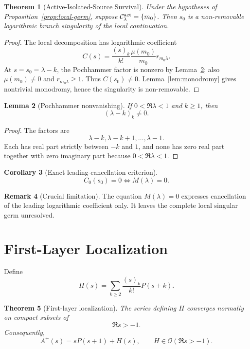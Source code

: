 \documentclass[11pt]{article}
\newtheorem{theorem}{Theorem}[section]
\newtheorem{corollary}[theorem]{Corollary}
\newtheorem{lemma}[theorem]{Lemma}
\theoremstyle{definition}
\newtheorem{remark}[theorem]{Remark}
\newcommand{\C}{\mathcal C}
\newcommand{\Ocal}{\mathcal O}
\begin{document}
\begin{theorem}[Active-Isolated-Source Survival]
\label{thm:survival}
Under the hypotheses of Proposition~\ref{prop:local-germ}, suppose $\C_\lambda^{\rm act}=\{m_0\}$. Then $s_0$ is a non-removable logarithmic branch singularity of the local continuation.
\end{theorem}

\begin{proof}
The local decomposition has logarithmic coefficient
\[
C(s)=\frac{(s)_k}{k!}\frac{\mu(m_0)}{m_0}r_{m_0\lambda}.
\]
At $s=s_0=\lambda-k$, the Pochhammer factor is nonzero by Lemma~\ref{lem:poch}; also $\mu(m_0)\ne0$ and $r_{m_0\lambda}\ge1$. Thus $C(s_0)\ne0$. Lemma~\ref{lem:monodromy} gives nontrivial monodromy, hence the singularity is non-removable.
\end{proof}


\begin{lemma}[Pochhammer nonvanishing]
\label{lem:poch}
If $0<\Re\lambda<1$ and $k\ge1$, then
\[
(\lambda-k)_k\ne0.
\]
\end{lemma}

\begin{proof}
The factors are
\[
\lambda-k,\lambda-k+1,\ldots,\lambda-1.
\]
Each has real part strictly between $-k$ and $1$, and none has zero real part together with zero imaginary part because $0<\Re\lambda<1$.
\end{proof}

\begin{corollary}[Exact leading-cancellation criterion]
\label{cor:cancellation}
\[
\boxed{
C_0(s_0)=0
\iff
M(\lambda)=0.
}
\]
\end{corollary}

\begin{remark}[Crucial limitation]
The equation $M(\lambda)=0$ expresses cancellation of the leading logarithmic coefficient only. It leaves the complete local singular germ unresolved.
\end{remark}

\section{First-Layer Localization}

Define
\[
H(s)=
\sum_{k\ge2}\frac{(s)_k}{k!}P(s+k).
\]

\begin{theorem}[First-layer localization]
\label{thm:firstlayer}
The series defining $H$ converges normally on compact subsets of
\[
\Re s>-1.
\]
Consequently,
\[
\boxed{
A^+(s)=sP(s+1)+H(s),
\qquad
H\in\Ocal(\Re s>-1).
}
\]
\end{theorem}
\end{document}
